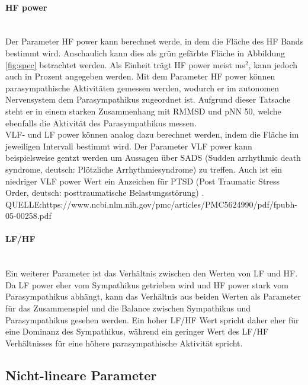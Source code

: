  \paragraph{HF power}\mbox{} \\
 Der Parameter HF power kann berechnet werde, in dem die Fläche des HF Bands bestimmt wird. Anschaulich kann dies als grün gefärbte Fläche in Abbildung \ref{fig:spec} betrachtet werden. Als Einheit trägt HF power meist ms$^{2}$, kann jedoch auch in Prozent angegeben werden. 
 Mit dem Parameter HF power können parasympathische Aktivitäten gemessen werden, wodurch er im autonomen Nervensystem dem Parasympathikus zugeordnet ist. Aufgrund dieser Tatsache steht er in einem starken Zusammenhang mit RMMSD und pNN 50, welche ebenfalls die Aktivität des Parasympathikus messen. \\
 VLF- und LF power können analog dazu berechnet werden, indem die Fläche im jeweiligen Intervall bestimmt wird. Der Parameter VLF power kann beispielsweise gentzt werden um Aussagen über SADS (Sudden arrhythmic death syndrome, deutsch: Plötzliche Arrhythmiesyndrome) zu treffen. Auch ist ein niedriger VLF power Wert ein Anzeichen für PTSD (Post Traumatic Stress Order, deutsch: posttraumatische Belastungsstörung) . QUELLE:https://www.ncbi.nlm.nih.gov/pmc/articles/PMC5624990/pdf/fpubh-05-00258.pdf
 
 \paragraph{LF/HF}\mbox{} \\
 Ein weiterer Parameter ist das Verhältnis zwischen den Werten von LF und HF. Da LF power eher vom Sympathikus getrieben wird und HF power stark vom Parasympathikus abhängt, kann das Verhältnis aus beiden Werten als Parameter für das Zusammenspiel und die Balance zwischen Sympathikus und Parasympathikus gesehen werden. Ein hoher LF/HF Wert spricht daher eher für eine Dominanz des Sympathikus, während ein geringer Wert des LF/HF Verhältnisses für eine höhere parasympathische Aktivität spricht. \cite[S.5]{med} 
 
 \subsection{Nicht-lineare Parameter}
 
